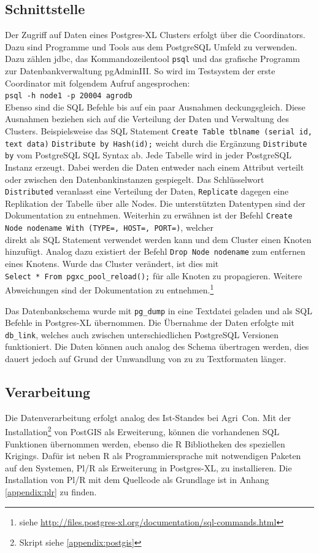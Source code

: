 \subsection{Schnittstelle}
\label{subsection:interface}
Der Zugriff auf Daten eines Postgres-XL Clusters erfolgt über die Coordinators.
Dazu sind Programme und Tools aus dem PostgreSQL Umfeld zu verwenden.
Dazu zählen \Gls{jdbc}, das Kommandozeilentool \verb+psql+ und das grafische Programm zur Datenbankverwaltung pgAdminIII.
So wird im Testsystem der erste Coordinator mit folgendem Aufruf angesprochen:\\
\verb+psql -h node1 -p 20004 agrodb+\\
Ebenso sind die SQL Befehle bis auf ein paar Ausnahmen deckungsgleich.
Diese Ausnahmen beziehen sich auf die Verteilung der Daten und Verwaltung des Clusters.
Beispielsweise das SQL Statement \verb+Create Table tblname (serial id, text data)+
\verb+Distribute by Hash(id);+ weicht durch die Ergänzung \verb+Distribute by+ vom PostgreSQL SQL Syntax ab.
Jede Tabelle wird in jeder PostgreSQL Instanz erzeugt.
Dabei werden die Daten entweder nach einem Attribut verteilt oder zwischen den Datenbankinstanzen gespiegelt.
Das Schlüsselwort \verb+Distributed+ veranlasst eine Verteilung der Daten, \verb+Replicate+ dagegen eine Replikation der Tabelle über alle Nodes.
Die unterstützten Datentypen sind der Dokumentation zu entnehmen.
Weiterhin zu erwähnen ist der Befehl \verb+Create Node nodename With (TYPE=, HOST=, PORT=)+, welcher\\
direkt als SQL Statement verwendet werden kann und dem Cluster einen Knoten hinzufügt.
Analog dazu existiert der Befehl \verb+Drop Node nodename+ zum entfernen eines Knotens.
Wurde das Cluster verändert, ist dies mit\\
\verb+Select * From pgxc_pool_reload();+ für alle Knoten zu propagieren.
Weitere Abweichungen sind der Dokumentation zu entnehmen.\footnote{siehe \url{http://files.postgres-xl.org/documentation/sql-commands.html}}

Das Datenbankschema wurde mit \verb+pg_dump+ in eine Textdatei geladen und als SQL Befehle in Postgres-XL übernommen.
Die Übernahme der Daten erfolgte mit \verb+db_link+, welches auch zwischen unterschiedlichen PostgreSQL Versionen funktioniert.
Die Daten können auch analog des Schema übertragen werden, dies dauert jedoch auf Grund der Umwandlung von zu zu Textformaten länger.

\subsection{Verarbeitung}
Die Datenverarbeitung erfolgt analog des Ist-Standes bei Agri~Con.
Mit der Installation\footnote{Skript siehe \ref{appendix:postgis}} von PostGIS als Erweiterung, können die vorhandenen SQL Funktionen übernommen werden, ebenso die R Bibliotheken des speziellen Krigings.
Dafür ist neben R als Programmiersprache mit notwendigen Paketen auf den Systemen, Pl/R als Erweiterung in Postgres-XL, zu installieren.
Die Installation von Pl/R mit dem Quellcode als Grundlage ist in Anhang \ref{appendix:plr} zu finden.

